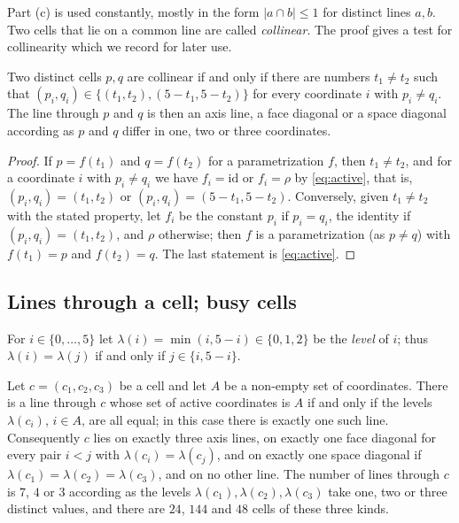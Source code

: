 Part (c) is used constantly, mostly in the form $|a\cap b|\le 1$ for distinct lines $a,b$. Two cells that
lie on a common line are called \emph{collinear}. The proof gives a test for collinearity which we record
for later use.

\begin{corollary}[Collinearity]\label{cor:collinear}
Two distinct cells $p,q$ are collinear if and only if there are numbers $t_1\ne t_2$ such that
$(p_i,q_i)\in\{(t_1,t_2),(5-t_1,5-t_2)\}$ for every coordinate $i$ with $p_i\ne q_i$. The line through
$p$ and $q$ is then an axis line, a face diagonal or a space diagonal according as $p$ and $q$ differ in
one, two or three coordinates.
\end{corollary}

\begin{proof}
If $p=f(t_1)$ and $q=f(t_2)$ for a parametrization $f$, then $t_1\ne t_2$, and for a coordinate $i$ with
$p_i\ne q_i$ we have $f_i=\mathrm{id}$ or $f_i=\rho$ by \eqref{eq:active}, that is,
$(p_i,q_i)=(t_1,t_2)$ or $(p_i,q_i)=(5-t_1,5-t_2)$. Conversely, given $t_1\ne t_2$ with the stated property,
let $f_i$ be the constant $p_i$ if $p_i=q_i$, the identity if $(p_i,q_i)=(t_1,t_2)$, and $\rho$ otherwise;
then $f$ is a parametrization (as $p\ne q$) with $f(t_1)=p$ and $f(t_2)=q$. The last statement is
\eqref{eq:active}.
\end{proof}

\subsection{Lines through a cell; busy cells}\label{ssec:busy}

For $i\in\{0,\dots,5\}$ let $\lambda(i)=\min(i,5-i)\in\{0,1,2\}$ be the \emph{level} of $i$; thus
$\lambda(i)=\lambda(j)$ if and only if $j\in\{i,5-i\}$.

\begin{lemma}\label{lem:degree}
Let $c=(c_1,c_2,c_3)$ be a cell and let $A$ be a non-empty set of coordinates. There is a line through $c$
whose set of active coordinates is $A$ if and only if the levels $\lambda(c_i)$, $i\in A$, are all equal;
in this case there is exactly one such line. Consequently $c$ lies on exactly three axis lines, on
exactly one face diagonal for every pair $i<j$ with $\lambda(c_i)=\lambda(c_j)$, and on exactly one space
diagonal if $\lambda(c_1)=\lambda(c_2)=\lambda(c_3)$, and on no other line. The number of lines through $c$
is $7$, $4$ or $3$ according as the levels $\lambda(c_1),\lambda(c_2),\lambda(c_3)$ take one, two or three
distinct values, and there are $24$, $144$ and $48$ cells of these three kinds.
\end{lemma}

